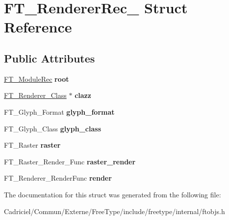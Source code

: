 \hypertarget{struct_f_t___renderer_rec__}{}\section{F\+T\+\_\+\+Renderer\+Rec\+\_\+ Struct Reference}
\label{struct_f_t___renderer_rec__}
\subsection*{Public Attributes}
\begin{DoxyCompactItemize}
\item 
\hyperlink{struct_f_t___module_rec__}{F\+T\+\_\+\+Module\+Rec} {\bfseries root}\hypertarget{struct_f_t___renderer_rec___a7c93326898f03a9eb224f57104fa2433}{}\label{struct_f_t___renderer_rec___a7c93326898f03a9eb224f57104fa2433}

\item 
\hyperlink{struct_f_t___renderer___class__}{F\+T\+\_\+\+Renderer\+\_\+\+Class} $\ast$ {\bfseries clazz}\hypertarget{struct_f_t___renderer_rec___a2b13c0a776ea7f589f41f576f9c4e8ad}{}\label{struct_f_t___renderer_rec___a2b13c0a776ea7f589f41f576f9c4e8ad}

\item 
F\+T\+\_\+\+Glyph\+\_\+\+Format {\bfseries glyph\+\_\+format}\hypertarget{struct_f_t___renderer_rec___a478b14f577b633cea7043fb17d404721}{}\label{struct_f_t___renderer_rec___a478b14f577b633cea7043fb17d404721}

\item 
F\+T\+\_\+\+Glyph\+\_\+\+Class {\bfseries glyph\+\_\+class}\hypertarget{struct_f_t___renderer_rec___a38a591be1d20fb2b4d81e48ebb624dd7}{}\label{struct_f_t___renderer_rec___a38a591be1d20fb2b4d81e48ebb624dd7}

\item 
F\+T\+\_\+\+Raster {\bfseries raster}\hypertarget{struct_f_t___renderer_rec___a9c54a2da84f5892e0563d032ebd1ee09}{}\label{struct_f_t___renderer_rec___a9c54a2da84f5892e0563d032ebd1ee09}

\item 
F\+T\+\_\+\+Raster\+\_\+\+Render\+\_\+\+Func {\bfseries raster\+\_\+render}\hypertarget{struct_f_t___renderer_rec___a6dc07268fc39d9dde130a5708607d19d}{}\label{struct_f_t___renderer_rec___a6dc07268fc39d9dde130a5708607d19d}

\item 
F\+T\+\_\+\+Renderer\+\_\+\+Render\+Func {\bfseries render}\hypertarget{struct_f_t___renderer_rec___a197bfeb9dde4aef8eee87bc3ea95312e}{}\label{struct_f_t___renderer_rec___a197bfeb9dde4aef8eee87bc3ea95312e}

\end{DoxyCompactItemize}


The documentation for this struct was generated from the following file\+:\begin{DoxyCompactItemize}
\item 
Cadriciel/\+Commun/\+Externe/\+Free\+Type/include/freetype/internal/ftobjs.\+h\end{DoxyCompactItemize}
